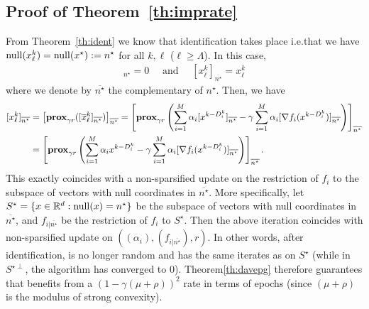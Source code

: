 \subsection{Proof of Theorem~\ref{th:imprate}}\label{apx:imprate}

From Theorem~\ref{th:ident} we know that identification takes place i.e.\;that we have $\mathrm{null}(x^k_\ell) = \mathrm{null}(x^\star) := n^\star$ for all $k,\ell$ ($\ell\geq\Lambda$).
In this case, 
\begin{align*}
    [x^k_\ell]_{n^\star} = 0 \quad\text{ and }\quad [x^k_\ell]_{\overline{n^\star}} = x_\ell^k
\end{align*}
where we denote by $\overline{n^\star}$ the complementary of $n^\star$. Then, we have
\begin{align*}
  \nonumber   [x^k_\ell]_{\overline{n^\star}}  
  &=\left[\mathbf{prox}_{\gamma r}([\overline{x}^k_\ell]_{\overline{n^\star}})\right]_{\overline{n^\star}}  
  = \left[\mathbf{prox}_{\gamma r}\left(\sum_{i=1}^M \alpha_i [x^{k-D_i^k}]_{\overline{n^\star}} - \gamma \sum_{i=1}^M \alpha_i [\nabla f_i(x^{k-D_i^k})]_{\overline{n^\star}} \right)\right]_{\overline{n^\star}} \\
     &=  \left[\mathbf{prox}_{\gamma r}\left(\sum_{i=1}^M \alpha_i x^{k-D_i^k} - \gamma \sum_{i=1}^M \alpha_i [\nabla f_i(x^{k-D_i^k})]_{\overline{n^\star}} \right)\right]_{\overline{n^\star}}.
\end{align*}
This exactly coincides with a non-sparsified update on the restriction of $f_i$ to the subspace of vectors with null coordinates in ${\overline{n^\star}}$. More specifically, let $S^\star = \{ x\in \mathbb{R}^d : \mathrm{null}(x) = n^\star \}$ be the subspace of vectors with null coordinates in ${\overline{n^\star}}$, and
$f_{i|{\overline{n^\star}}}$ be the restriction of $f_i$ to $S^\star$.
Then the above iteration coincides with non-sparsified update on
$((\alpha_i),(f_{i|{\overline{n^\star}}}),r)$. In other words, after identification, \salgo is no longer random and has the same iterates as \dave on $S^\star$ (while in $S^{\star\perp}$, the algorithm has converged to $0$). Theorem\;\ref{th:davepg} therefore guarantees that \salgo benefits from a $(1-\gamma (\mu+\rho))^2$ rate in terms of epochs (since $(\mu+\rho)$ is the modulus of strong convexity).



